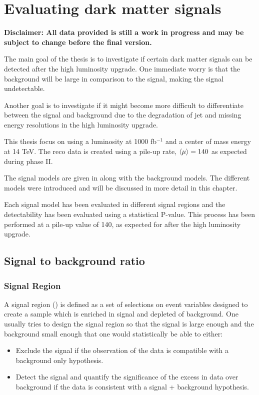 \chapter{Evaluating dark matter signals}

\textbf{Disclaimer: All data provided is still a work in progress and may be subject to change before the final version.}

The main goal of the thesis is to investigate if certain dark matter signals can be detected after the high luminosity upgrade. One immediate worry is that the background will be large in comparison to the signal, making the signal undetectable.

Another goal is to investigate if it might become more difficult to differentiate between the signal and background due to the degradation of jet and missing energy resolutions in the high luminosity upgrade.

This thesis focus on using a luminosity at 1000 fb$^{-1}$ and a center of mass energy at 14 TeV. The reco data is created using a pile-up rate, $\left<\mu\right> = 140$ as expected during phase II.

The signal models are given in  along with the background models. The different models were introduced  and will be discussed in more detail in this chapter.

Each signal model has been evaluated in different signal regions and the detectability has been evaluated using a statistical P-value. This process has been performed at a pile-up value of 140, as expected for after the high luminosity upgrade. 

\newpage
\section{Signal to background ratio}
\subsection{Signal Region}
A signal region (\abbrSR) is defined as a set of selections on event variables designed to create a sample which is enriched in signal and depleted of background. One usually tries to design the signal region so that the signal is large enough and the background small enough that one would statistically be able to either:
\begin{itemize}
\item Exclude the signal if the observation of the data is compatible with a background only hypothesis.
\item Detect the signal and quantify the significance of the excess in data over background if the data is consistent with a signal + background hypothesis.
\end{itemize}

